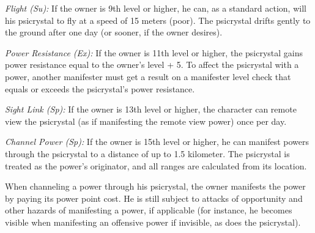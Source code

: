 \textit{Flight (Su):} If the owner is 9th level or higher, he can, as a standard action, will his psicrystal to fly at a speed of 15 meters (poor). The psicrystal drifts gently to the ground after one day (or sooner, if the owner desires).

\textit{Power Resistance (Ex):} If the owner is 11th level or higher, the psicrystal gains power resistance equal to the owner's level + 5. To affect the psicrystal with a power, another manifester must get a result on a manifester level check that equals or exceeds the psicrystal's power resistance.

\textit{Sight Link (Sp):} If the owner is 13th level or higher, the character can remote view the psicrystal (as if manifesting the remote view power) once per day.

\textit{Channel Power (Sp):} If the owner is 15th level or higher, he can manifest powers through the psicrystal to a distance of up to 1.5 kilometer. The psicrystal is treated as the power's originator, and all ranges are calculated from its location.

When channeling a power through his psicrystal, the owner manifests the power by paying its power point cost. He is still subject to attacks of opportunity and other hazards of manifesting a power, if applicable (for instance, he becomes visible when manifesting an offensive power if invisible, as does the psicrystal).


